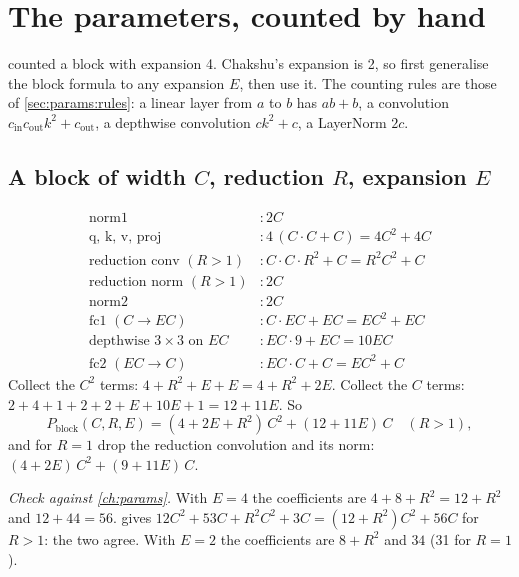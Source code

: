 \section{The parameters, counted by hand}\label{sec:chakshu:params}

 counted a block with expansion 4. Chakshu's expansion is 2, so first generalise the block formula to
any expansion $E$, then use it. The counting rules are those of \cref{sec:params:rules}: a linear layer from $a$ to
$b$ has $ab+b$, a convolution $c_\text{in}c_\text{out}k^2+c_\text{out}$, a depthwise convolution $ck^2+c$, a
LayerNorm $2c$.

\subsection{A block of width \texorpdfstring{$C$}{C}, reduction \texorpdfstring{$R$}{R}, expansion \texorpdfstring{$E$}{E}}

\begin{align*}
\text{norm1} &: 2C\\
\text{q, k, v, proj} &: 4\,(C\cdot C+C) = 4C^2+4C\\
\text{reduction conv } (R>1) &: C\cdot C\cdot R^2+C = R^2C^2+C\\
\text{reduction norm } (R>1) &: 2C\\
\text{norm2} &: 2C\\
\text{fc1 } (C\to EC) &: C\cdot EC+EC = EC^2+EC\\
\text{depthwise } 3\times3 \text{ on } EC &: EC\cdot9+EC = 10EC\\
\text{fc2 } (EC\to C) &: EC\cdot C+C = EC^2+C
\end{align*}
Collect the $C^2$ terms: $4+R^2+E+E=4+R^2+2E$. Collect the $C$ terms: $2+4+1+2+2+E+10E+1=12+11E$. So
\begin{equation}\label{eq:chakshu:block}
P_\text{block}(C,R,E) = (4+2E+R^2)\,C^2 + (12+11E)\,C \quad (R>1),
\end{equation}
and for $R=1$ drop the reduction convolution and its norm: $(4+2E)\,C^2+(9+11E)\,C$.

\emph{Check against \cref{ch:params}.} With $E=4$ the coefficients are $4+8+R^2=12+R^2$ and $12+44=56$.
 gives $12C^2+53C+R^2C^2+3C=(12+R^2)C^2+56C$ for $R>1$: the two agree. With $E=2$ the
coefficients are $8+R^2$ and $34$ (31 for $R=1$).

